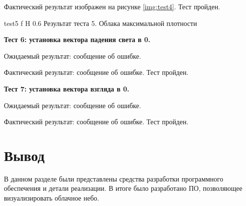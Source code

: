 Фактический результат изображен на рисунке \ref{img:test4}. Тест пройден.

{test5} %
{f} %
{H} %
{0.6\textwidth} %
{Результат теста 5. Облака максимальной плотности} %


\textbf{Тест 6: установка вектора падения света в 0.}

Ожидаемый результат: сообщение об ошибке.

Фактический результат: сообщение об ошибке. Тест пройден.


\textbf{Тест 7: установка вектора взгляда в 0.}

Ожидаемый результат: сообщение об ошибке.

Фактический результат: сообщение об ошибке. Тест пройден.


\section*{Вывод}

В данном разделе были представлены средства разработки программного обеспечения и детали реализации. В итоге было разработано ПО, позволяющее визуализировать облачное небо.



